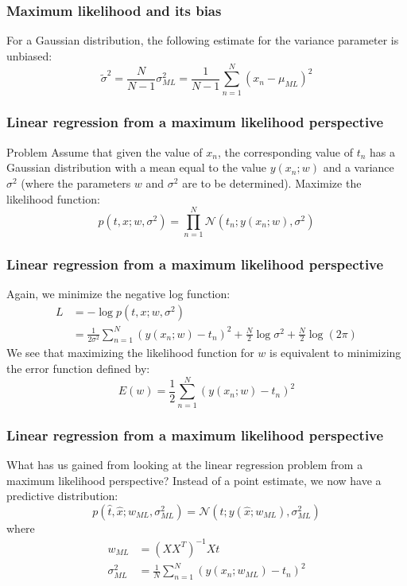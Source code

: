 \documentclass{beamer}
\begin{document}
\begin{frame}
    \frametitle{Maximum likelihood and its bias}
    For a Gaussian distribution, the following estimate for the variance parameter is unbiased:
    \begin{equation*}
        \tilde{\sigma}^{2}=\frac{N}{N-1}\sigma^{2}_{ML}=\frac{1}{N-1}\sum_{n=1}^{N}(x_{n}-\mu_{ML})^{2}
    \end{equation*}
\end{frame}

\begin{frame}
    \frametitle{Linear regression from a maximum likelihood perspective}
    \begin{block}{Problem}
        Assume that given the value of $x_{n}$, the corresponding value of $t_{n}$ has a Gaussian distribution with a mean equal to the value $y(x_{n};w)$ and a variance $\sigma^{2}$ (where the parameters $w$ and $\sigma^{2}$ are to be determined). Maximize the
        likelihood function:
        \begin{equation*}
            p(t,x;w,\sigma^{2})=\prod_{n=1}^{N}\mathcal{N}(t_{n};y(x_{n};w),\sigma^{2})
        \end{equation*}
    \end{block}
\end{frame}

\begin{frame}
    \frametitle{Linear regression from a maximum likelihood perspective}
    Again, we minimize the negative log function:
    \begin{align*}
        L&=-\log{}p(t,x;w,\sigma^{2}) \\
        &=\frac{1}{2\sigma^{2}}\sum_{n=1}^{N}(y(x_{n};w)-t_{n})^{2}+\frac{N}{2}\log\sigma^{2}+\frac{N}{2}\log(2\pi)
    \end{align*}
    We see that maximizing the likelihood function for $w$ is equivalent to minimizing the error function defined by:
    \begin{equation*}
        E(w)=\frac{1}{2}\sum_{n=1}^{N}(y(x_{n};w)-t_{n})^{2}
    \end{equation*}
\end{frame}

\begin{frame}
    \frametitle{Linear regression from a maximum likelihood perspective}
    What has us gained from looking at the linear regression problem from a maximum likelihood perspective? Instead of a point estimate, we now have a predictive distribution:
    \begin{equation*}
        p(\hat{t},\hat{x};w_{ML},\sigma^{2}_{ML})=\mathcal{N}(\hat{t};y(\hat{x};w_{ML}),\sigma^{2}_{ML})
    \end{equation*}
    where
    \begin{align*}
        w_{ML}&=(XX^{T})^{-1}Xt \\
        \sigma^{2}_{ML}&=\frac{1}{N}\sum_{n=1}^{N}(y(x_{n};w_{ML})-t_{n})^{2}
    \end{align*}
\end{frame}
\end{document}
